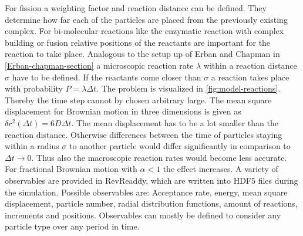\documentclass[
  a4paper,BCOR10mm,oneside,
  headsepline,footsepline,%
  fleqn,openbib
]{scrbook}
\begin{document}
\par
For fission a weighting factor and reaction distance can be defined. They determine how far each of the particles are placed from the previously existing complex. For bi-molecular reactions like the enzymatic reaction with complex building  or fusion  relative positions of the reactants are important for the reaction to take place. Analogous to the setup up of Erban and Chapman in \cref{Erban-chapman-section} a microscopic reaction rate $\lambda$ within a reaction distance $\sigma$ have to be defined. If the reactants come closer than $\sigma$ a reaction takes place with probability $P= \lambda \Delta t$. The problem is visualized in \cref{fig:model-reactions}. Thereby the time step cannot by chosen arbitrary large. The mean square displacement for Brownian motion in three dimensions is given as $\delta r^2(\Delta t)= 6D \Delta t$. The mean displacement has to be a lot smaller than the reaction distance. Otherwise differences between the time of particles staying within a radius $\sigma$ to another particle would differ significantly in comparison to $\Delta t \rightarrow 0$. Thus also the macroscopic reaction rates would become less accurate. For fractional Brownian motion with $\alpha<1$ the effect increases. A variety of observables are provided in RevReaddy, which are written into HDF5 files during the simulation. Possible observables are: Acceptance rate, energy, mean square displacement, particle number, radial distribution functions, amount of reactions, increments and positions. Observables can mostly be defined to consider any particle type over any period in time. 
\end{document}
